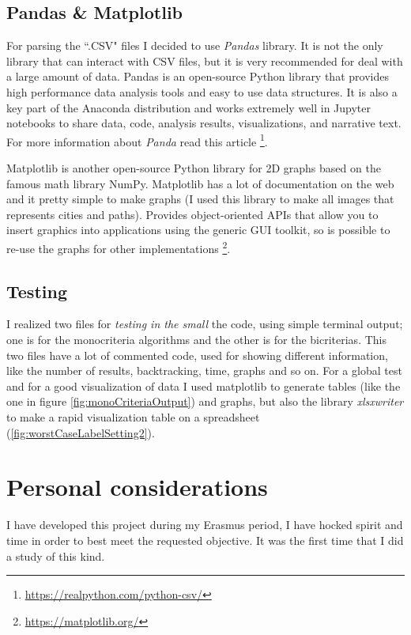 \documentclass[a4paper,11pt]{report}
\begin{document}
\section{Pandas \& Matplotlib}
For parsing the ``.CSV" files I decided to use \textit{Pandas} library. It is not the only library that can interact with CSV files, but it is very recommended for deal with a large amount of data.
Pandas is an open-source Python library that provides high performance data analysis tools and easy to use data structures. It is also a key part of the Anaconda distribution and works extremely well in Jupyter notebooks to share data, code, analysis results, visualizations, and narrative text. For more information about \textit{Panda} read this article \footnote{\url{https://realpython.com/python-csv/}}.
\vspace{5mm}

Matplotlib is another open-source Python library for 2D graphs based on the famous math library NumPy. Matplotlib has a lot of documentation on the web and it pretty simple to make graphs (I used this library to make all images that represents cities and paths).
Provides object-oriented APIs that allow you to insert graphics into applications using the generic GUI toolkit, so is possible to re-use the graphs for other implementations \footnote{\url{https://matplotlib.org/}}.
\section{Testing}
I realized two files for \textit{testing in the small} the code, using simple terminal output; one is for the monocriteria algorithms and the other is for the bicriterias. This two files have a lot of commented code, used for showing different information, like the number of results, backtracking, time, graphs and so on. For a global test and for a good visualization of data I used matplotlib to generate tables (like the one in figure \ref{fig:monoCriteriaOutput}) and graphs, but also the library \textit{xlsxwriter} to make a rapid visualization table on a spreadsheet (\ref{fig:worstCaseLabelSetting2}).

\chapter{Personal considerations}
I have developed this project during my Erasmus period, I have hocked spirit and time in order to best meet the requested objective. It was the first time that I did a study of this kind.
\end{document}
